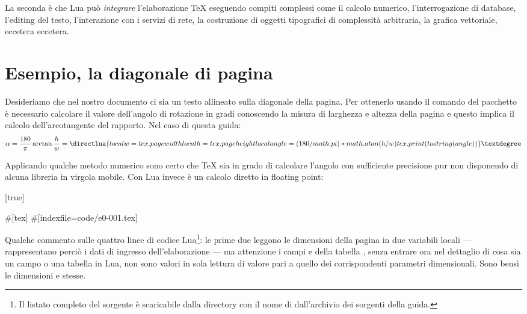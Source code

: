 La seconda è che Lua può \emph{integrare} l'elaborazione \TeX{} eseguendo
compiti complessi come il calcolo numerico, l'interrogazione di database,
l'editing del testo, l'interazione con i servizi di rete, la costruzione di
oggetti tipografici di complessità arbitraria, la grafica vettoriale, eccetera
eccetera.


\section{Esempio, la diagonale di pagina}

Desideriamo che nel nostro documento ci sia un testo allineato sulla diagonale
della pagina. Per ottenerlo usando il comando  del pacchetto
 è necessario calcolare il valore dell'angolo di rotazione in
gradi conoscendo la misura di larghezza e altezza della pagina e questo implica
il calcolo dell'arcotangente del rapporto. Nel caso di questa guida:
\[
    \alpha = \frac{180}{\pi}\arctan{\frac{h}{w}} = \directlua{
        local w = tex.pagewidth
        local h = tex.pageheight
        local angle = (180/math.pi) * math.atan(h/w)
        tex.print(tostring(angle))
    }°
\]

Applicando qualche metodo numerico sono certo che \TeX{} sia in grado di
calcolare l'angolo con sufficiente precisione pur non disponendo di alcuna
libreria in virgola mobile. Con Lua invece è un calcolo diretto in floating
point:

[true]%
%
%
\begin{lines}
#[tex]
#[indexfile=code/e0-001.tex]
\end{lines}

Qualche commento sulle quattro linee di codice Lua\footnote{Il listato completo
del sorgente è scaricabile dalla directory  con il nome di
 dall'archivio dei sorgenti della guida.}: le prime due
leggono le dimensioni della pagina in due variabili locali --- rappresentano
perciò i dati di ingresso dell'elaborazione --- ma attenzione i campi
 e  della tabella , senza entrare ora
nel dettaglio di cosa sia un campo o una tabella in Lua, non sono valori in sola
lettura di valore pari a quello dei corrispondenti parametri dimensionali. Sono
bensì le dimensioni  e  stesse.

